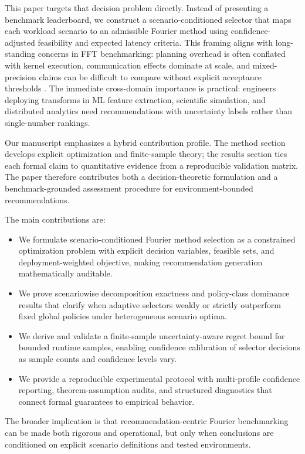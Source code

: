 \documentclass{article} %
\begin{document}
This paper targets that decision problem directly. Instead of presenting a benchmark leaderboard, we construct a scenario-conditioned selector that maps each workload scenario to an admissible Fourier method using confidence-adjusted feasibility and expected latency criteria. This framing aligns with long-standing concerns in FFT benchmarking: planning overhead is often conflated with kernel execution, communication effects dominate at scale, and mixed-precision claims can be difficult to compare without explicit acceptance thresholds \citep{S03,S07,S21,S39,S41,S42}. The immediate cross-domain importance is practical: engineers deploying transforms in ML feature extraction, scientific simulation, and distributed analytics need recommendations with uncertainty labels rather than single-number rankings.

Our manuscript emphasizes a hybrid contribution profile. The method section develops explicit optimization and finite-sample theory; the results section ties each formal claim to quantitative evidence from a reproducible validation matrix. The paper therefore contributes both a decision-theoretic formulation and a benchmark-grounded assessment procedure for environment-bounded recommendations.

The main contributions are:
\begin{itemize}
\item We formulate scenario-conditioned Fourier method selection as a constrained optimization problem with explicit decision variables, feasible sets, and deployment-weighted objective, making recommendation generation mathematically auditable.
\item We prove scenariowise decomposition exactness and policy-class dominance results that clarify when adaptive selectors weakly or strictly outperform fixed global policies under heterogeneous scenario optima.
\item We derive and validate a finite-sample uncertainty-aware regret bound for bounded runtime samples, enabling confidence calibration of selector decisions as sample counts and confidence levels vary.
\item We provide a reproducible experimental protocol with multi-profile confidence reporting, theorem-assumption audits, and structured diagnostics that connect formal guarantees to empirical behavior.
\end{itemize}

The broader implication is that recommendation-centric Fourier benchmarking can be made both rigorous and operational, but only when conclusions are conditioned on explicit scenario definitions and tested environments.
\end{document}
